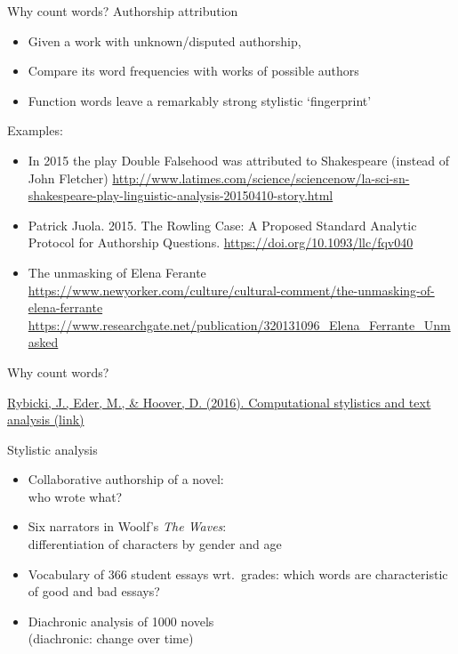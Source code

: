 \documentclass[aspectratio=169,usenames,dvipsnames]{beamer}
\begin{document}
\begin{frame}{Why count words?}
    Authorship attribution
    \begin{itemize}
        \item Given a work with unknown/disputed authorship,
        \item Compare its word frequencies with works of possible authors
        \item Function words leave a remarkably strong stylistic `fingerprint'
    \end{itemize}

    \pause
    Examples:
    \begin{itemize}
        \item In 2015 the play Double Falsehood was attributed to Shakespeare
                (instead of John Fletcher)
            \url{http://www.latimes.com/science/sciencenow/la-sci-sn-shakespeare-play-linguistic-analysis-20150410-story.html}

        \item Patrick Juola. 2015. The Rowling Case: A Proposed Standard Analytic Protocol for Authorship Questions. %
            \url{https://doi.org/10.1093/llc/fqv040}
        \item The unmasking of Elena Ferante
            \url{https://www.newyorker.com/culture/cultural-comment/the-unmasking-of-elena-ferrante}
            \\
            {\small\url{https://www.researchgate.net/publication/320131096_Elena_Ferrante_Unmasked}}
    \end{itemize}
\end{frame}

\begin{frame}{Why count words?}
    \begin{reference}
        \href{http://www.infotext.unisi.it/upload/rybickihoovereder_with_figures.pdf}{Rybicki, J., Eder, M., \& Hoover, D. (2016). Computational stylistics and text analysis (link)}
    \end{reference}
    Stylistic analysis
    \begin{itemize}
    \item Collaborative authorship of a novel:\\
        who wrote what?
    \item Six narrators in Woolf's \emph{The Waves}:\\
        differentiation of characters by gender and age
    \item Vocabulary of 366 student essays wrt.\ grades:
        which words are characteristic of good and bad essays?
    \item Diachronic analysis of 1000 novels \\
        (diachronic: change over time)
    \end{itemize}
\end{frame}
\end{document}
